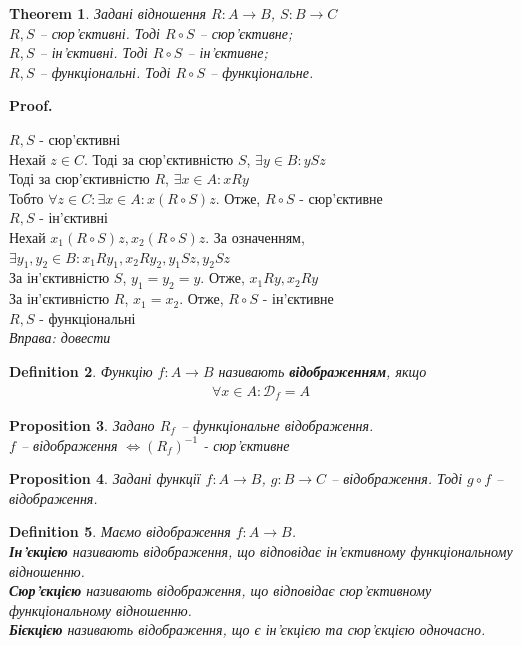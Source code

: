 \documentclass[a4paper, 14pt]{extarticle}
\makeatletter
\theoremstyle{theoremdd}
\newtheorem{theorem}{Theorem}[subsection]
\theoremstyle{theoremdd}
\newtheorem{definition}[theorem]{Definition}
\theoremstyle{theoremdd}
\theoremstyle{theoremdd}
\theoremstyle{theoremdd}
\theoremstyle{theoremdd}
\theoremstyle{theoremdd}
\theoremstyle{theoremdd}
\theoremstyle{theoremdd}
\newtheorem{proposition}[theorem]{Proposition}
\theoremstyle{theoremdd}
\theoremstyle{theoremdd}
\theoremstyle{theoremdd}
\theoremstyle{theoremdd}
\theoremstyle{theoremdd}
\theoremstyle{theoremdd}
\renewenvironment{proof}[1][Proof.\\]{\par
\pushQED{\hfill \qed}%
\normalfont \topsep6\p@\@plus6\p@\relax
\trivlist
\item\relax
{\bfseries
#1\@addpunct{.}}\hspace\labelsep\ignorespaces
}{%
\popQED\endtrivlist\@endpefalse
}
\makeatother
\begin{document}
\begin{theorem}
Задані відношення $R \colon A \to B$, $S \colon B \to C$\\
$R,S$ -- сюр'єктивні. Тоді $R \circ S$ -- сюр'єктивне;\\
$R,S$ -- ін'єктивні. Тоді $R \circ S$ -- ін'єктивне;\\
$R,S$ -- функціональні. Тоді $R \circ S$ -- функціональне.
\end{theorem}

\begin{proof}
$R,S$ - сюр'єктивні\\
Нехай $z \in C$. Тоді за сюр'єктивністю $S$, $\exists y \in B: ySz$\\
Тоді за сюр'єктивністю $R$, $\exists x \in A: xRy$\\
Тобто $\forall z \in C: \exists x \in A: x(R \circ S)z$. Отже, $R \circ S$ - сюр'єктивне
\bigskip \\
$R,S$ - ін'єктивні\\
Нехай $x_1(R \circ S)z, x_2(R \circ S)z$. За означенням,\\
$\exists y_1,y_2 \in B: x_1Ry_1, x_2Ry_2, y_1Sz, y_2Sz$\\
За ін'єктивністю $S$, $y_1 = y_2 = y$. Отже, $x_1Ry,x_2Ry$\\
За ін'єктивністю $R$, $x_1 = x_2$. Отже, $R \circ S$ - ін'єктивне
\bigskip \\
$R,S$ - функціональні\\
\textit{Вправа: довести}
\end{proof}

\begin{definition}
Функцію $f \colon A \to B$ називають \textbf{відображенням}, якщо
\begin{align*}
\forall x \in A: \mathcal{D}_f = A
\end{align*}
\end{definition}

\begin{proposition}
Задано $R_f$ -- функціональне відображення.\\
$f$ -- відображення $\iff (R_f)^{-1}$ - сюр'єктивне
\end{proposition}

\begin{proposition}
Задані функції $f \colon A \to B$, $g \colon B \to C$ -- відображення. Тоді $g \circ f$ -- відображення.
\end{proposition}

\begin{definition} Маємо відображення $f \colon A \to B$.\\
\textbf{Ін'єкцією} називають відображення, що відповідає ін'єктивному функціональному відношенню.\\
\textbf{Сюр'єкцією} називають відображення, що відповідає сюр'єктивному функціональному відношенню.\\
\textbf{Бієкцією} називають відображення, що є ін'єкцією та сюр'єкцією одночасно.
\end{definition}
\end{document}
